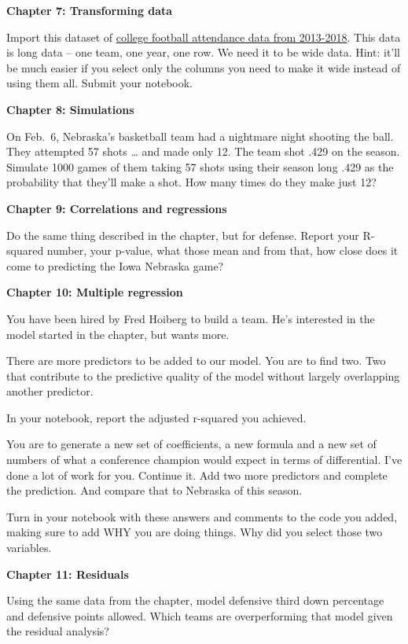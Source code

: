 \documentclass[]{book}
\begin{document}
\textbf{Chapter 7: Transforming data}

Import this dataset of \href{https://unl.box.com/s/fs3rj0dns1xh2y1dx0c2yc0adh4u3zsy}{college football attendance data from 2013-2018}. This data is long data -- one team, one year, one row. We need it to be wide data. Hint: it'll be much easier if you select only the columns you need to make it wide instead of using them all. Submit your notebook.

\textbf{Chapter 8: Simulations}

On Feb.~6, Nebraska's basketball team had a nightmare night shooting the ball. They attempted 57 shots \ldots{} and made only 12. The team shot .429 on the season. Simulate 1000 games of them taking 57 shots using their season long .429 as the probability that they'll make a shot. How many times do they make just 12?

\textbf{Chapter 9: Correlations and regressions}

Do the same thing described in the chapter, but for defense. Report your R-squared number, your p-value, what those mean and from that, how close does it come to predicting the Iowa Nebraska game?

\textbf{Chapter 10: Multiple regression}

You have been hired by Fred Hoiberg to build a team. He's interested in the model started in the chapter, but wants more.

There are more predictors to be added to our model. You are to find two. Two that contribute to the predictive quality of the model without largely overlapping another predictor.

In your notebook, report the adjusted r-squared you achieved.

You are to generate a new set of coefficients, a new formula and a new set of numbers of what a conference champion would expect in terms of differential. I've done a lot of work for you. Continue it. Add two more predictors and complete the prediction. And compare that to Nebraska of this season.

Turn in your notebook with these answers and comments to the code you added, making sure to add WHY you are doing things. Why did you select those two variables.

\textbf{Chapter 11: Residuals}

Using the same data from the chapter, model defensive third down percentage and defensive points allowed. Which teams are overperforming that model given the residual analysis?
\end{document}

